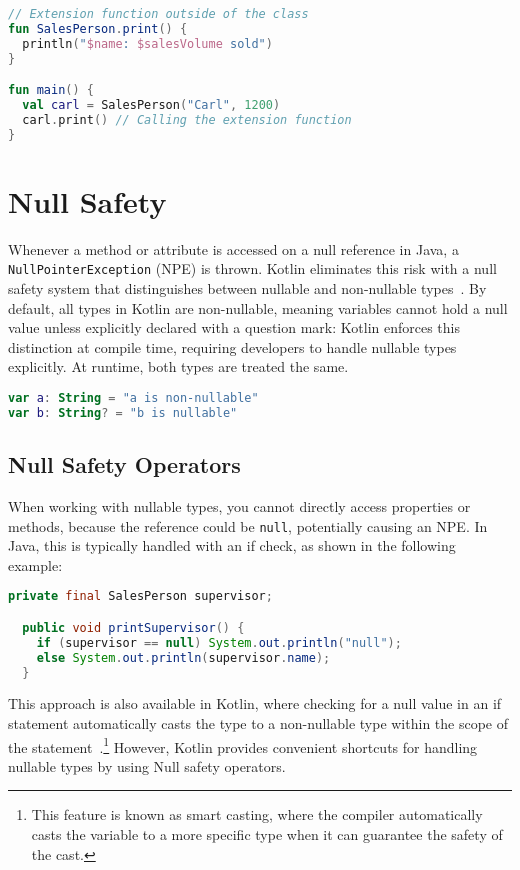 \documentclass[a4paper,11pt]{article}
\begin{document}
\begin{lstlisting}[language=Kotlin, title={Extension Function}]
// Extension function outside of the class
fun SalesPerson.print() {
  println("$name: $salesVolume sold")
}

fun main() {
  val carl = SalesPerson("Carl", 1200)
  carl.print() // Calling the extension function
}
\end{lstlisting}

\section{Null Safety}
Whenever a method or attribute is accessed on a null reference in Java, a \texttt{NullPointer\allowbreak Exception} (NPE) is thrown. Kotlin eliminates this risk with a null safety system that distinguishes between nullable and non-nullable types~\cite{nullsafety,nullsafety-nullable-types}. By default, all types in Kotlin are non-nullable, meaning variables cannot hold a null value unless explicitly declared with a question mark:
Kotlin enforces this distinction at compile time, requiring developers to handle nullable types explicitly. At runtime, both types are treated the same.
\begin{lstlisting}[language=Kotlin]
var a: String = "a is non-nullable"
var b: String? = "b is nullable"
\end{lstlisting}

\subsection{Null Safety Operators}
When working with nullable types, you cannot directly access properties or methods, because the reference could be \texttt{null}, potentially causing an NPE\@.
In Java, this is typically handled with an if check, as shown in the following example:
\begin{lstlisting}[language=Java]
  private final SalesPerson supervisor;

  public void printSupervisor() {
    if (supervisor == null) System.out.println("null");
    else System.out.println(supervisor.name);
  }
\end{lstlisting}

This approach is also available in Kotlin, where checking for a null value in an if statement automatically casts the type to a non-nullable type within the scope of the statement~\cite{nullsafety-if-condition}.\footnote{This feature is known as smart casting, where the compiler automatically casts the variable to a more specific type when it can guarantee the safety of the cast.}
However, Kotlin provides convenient shortcuts for handling nullable types by using Null safety operators.
\end{document}
